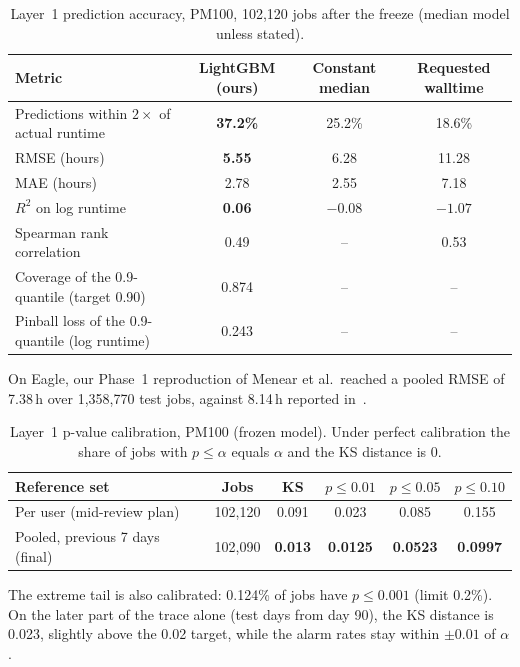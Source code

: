 \documentclass[10pt,a4paper]{article}
\begin{document}
\begin{table}[H]
\centering
\caption{Layer~1 prediction accuracy, PM100, 102{,}120 jobs after the freeze (median model unless stated).}
\label{tab:l1pred}
\small
\begin{tabular}{@{}lccc@{}}
\toprule
Metric & LightGBM (ours) & Constant median & Requested walltime\\
\midrule
Predictions within $2\times$ of actual runtime & \textbf{37.2\%} & 25.2\% & 18.6\%\\
RMSE (hours) & \textbf{5.55} & 6.28 & 11.28\\
MAE (hours) & 2.78 & 2.55 & 7.18\\
$R^2$ on log runtime & \textbf{0.06} & $-0.08$ & $-1.07$\\
Spearman rank correlation & 0.49 & -- & 0.53\\
Coverage of the 0.9-quantile (target 0.90) & 0.874 & -- & --\\
Pinball loss of the 0.9-quantile (log runtime) & 0.243 & -- & --\\
\bottomrule
\end{tabular}
\end{table}

On Eagle, our Phase~1 reproduction of Menear et al.\ reached a pooled RMSE of 7.38\,h over 1{,}358{,}770 test jobs, against 8.14\,h reported in~\cite{menear}.

\begin{table}[H]
\centering
\caption{Layer~1 p-value calibration, PM100 (frozen model). Under perfect calibration the share of jobs with $p \le \alpha$ equals $\alpha$ and the KS distance is 0.}
\label{tab:l1cal}
\small
\begin{tabular}{@{}lccccc@{}}
\toprule
Reference set & Jobs & KS & $p \le 0.01$ & $p \le 0.05$ & $p \le 0.10$\\
\midrule
Per user (mid-review plan) & 102{,}120 & 0.091 & 0.023 & 0.085 & 0.155\\
Pooled, previous 7 days (final) & 102{,}090 & \textbf{0.013} & \textbf{0.0125} & \textbf{0.0523} & \textbf{0.0997}\\
\bottomrule
\end{tabular}
\end{table}

The extreme tail is also calibrated: 0.124\% of jobs have $p \le 0.001$ (limit 0.2\%). On the later part of the trace alone (test days from day 90), the KS distance is 0.023, slightly above the 0.02 target, while the alarm rates stay within $\pm 0.01$ of $\alpha$.
\end{document}
